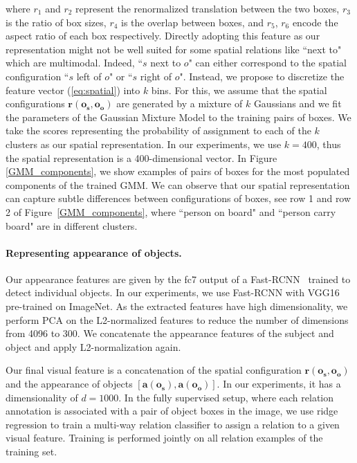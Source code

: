 \documentclass[10pt,twocolumn,letterpaper]{article}
\newcommand{\spaceparagraph}{\vspace{-.35cm}}
\newcommand{\gotoline}{\vspace{.05cm}}
\begin{document}
\noindent where $r_1$ and $r_2$ represent the renormalized translation between the two boxes, $r_3$ is the ratio of box sizes, $r_4$ is the overlap between boxes, and $r_5$, $r_6$ encode the aspect ratio of each box respectively. Directly adopting this feature as our representation might not be well suited for some spatial relations like ``next to" which are multimodal. Indeed, ``$s$ next to $o$" can either correspond to the spatial configuration ``$s$ left of $o$" or ``$s$ right of $o$". Instead, we propose to discretize the feature vector (\ref{eq:spatial}) into $k$ bins. For this, we assume that the spatial configurations $\bm{r}(\bm{o_s},\bm{o_o})$ are generated by a mixture of $k$ Gaussians and we fit the parameters of the Gaussian Mixture Model to the training pairs of boxes. We take the scores representing the probability of assignment to each of the $k$ clusters as our spatial representation. In our experiments, we use $k=400$, thus the spatial representation is a 400-dimensional vector. In Figure \ref{GMM_components}, we show examples of pairs of boxes for the most populated components of the trained GMM. We can observe that our spatial representation can capture subtle differences between configurations of boxes, see row 1 and row 2 of Figure~\ref{GMM_components}, where ``person on board" and ``person carry board" are in different clusters.
  
\spaceparagraph
\paragraph{Representing appearance of objects.} 
Our appearance features are given by the fc7 output of a Fast-RCNN~\cite{girshick15fastrcnn} trained to detect individual objects. In our experiments, we use Fast-RCNN with VGG16 pre-trained on ImageNet. As the extracted features have high dimensionality, we perform PCA on the L2-normalized features to reduce the number of dimensions from 4096 to 300. We concatenate the appearance features of the subject and object and apply L2-normalization again. 


\gotoline
\vspace{4pt}
Our final visual feature is a concatenation of the spatial configuration $\bm{r}(\bm{o_s},\bm{o_o})$ and the appearance of objects $[\bm{a}(\bm{o_s}), \bm{a}(\bm{o_o})]$. In our experiments, it has a dimensionality of $d=1000$. 
In the fully supervised setup, where each relation annotation is associated with a pair of object boxes in the image, we use ridge regression to train a multi-way relation classifier to assign a relation to a given 
visual feature. Training is performed jointly on all relation examples of the training set.
\end{document}

